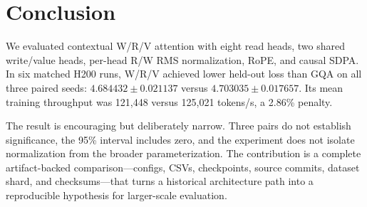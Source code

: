 \section{Conclusion}

We evaluated contextual W/R/V attention with eight read heads, two shared write/value heads, per-head R/W RMS normalization, RoPE, and causal SDPA. In six matched H200 runs, W/R/V achieved lower held-out loss than GQA on all three paired seeds: $4.684432\pm0.021137$ versus $4.703035\pm0.017657$. Its mean training throughput was 121,448 versus 125,021 tokens/s, a 2.86\% penalty.

The result is encouraging but deliberately narrow. Three pairs do not establish significance, the 95\% interval includes zero, and the experiment does not isolate normalization from the broader parameterization. The contribution is a complete artifact-backed comparison---configs, CSVs, checkpoints, source commits, dataset shard, and checksums---that turns a historical architecture path into a reproducible hypothesis for larger-scale evaluation.